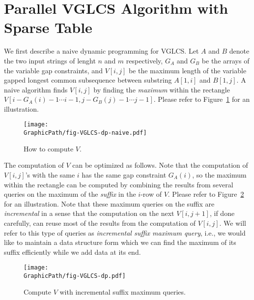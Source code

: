 \section{Parallel VGLCS Algorithm with Sparse Table} %
\label{sec:parallelVGLCS}


We first describe a naive dynamic programming for VGLCS.  Let $A$ and
$B$ denote the two input strings of lenght $n$ and $m$ respectively,
$G_A$ and $G_B$ be the arrays of the variable gap constraints, and
$V[i, j]$ be the maximum length of the variable gapped longest common
subsequence between substring $A[1, i]$ and $B[1, j]$.  A naive
algorithm finds $V[i, j]$ by finding the {\em maximum} within the
rectangle $V[i-G_A(i)-1 \cdots i-1, j-G_B(j)-1 \cdots j-1]$.  Please
refer to Figure~\ref{fig:fig-VGLCS-dp-naive} for an illustration.

\begin{figure}[!thb]
  \texttt{[image: \\GraphicPath/fig-VGLCS-dp-naive.pdf]}
  \caption{How to compute $V$.}
  \label{fig:fig-VGLCS-dp-naive}
\end{figure}

The computation of $V$ can be optimized as follows.  Note that the
computation of $V[i, j]$'s with the same $i$ has the same gap
constraint $G_A(i)$, so the maximum within the rectangle can be
computed by combining the results from several queries on the maximum
of the {\em suffix} in the $i$-row of $V$.  Please refer to
Figure~\ref{fig:fig-VGLCS-dp} for an illustration.  Note that these
maximum queries on the suffix are {\em incremental} in a sense that
the computation on the next $V[i, j + 1]$, if done carefully, can
reuse most of the results from the computation of $V[i, j]$.  We will
refer to this type of queries as {\em incremental suffix maximum
  query}, i.e., we would like to maintain a data structure form which
we can find the maximum of its suffix efficiently while we add data at
its end.

\begin{figure}[!thb]
  \texttt{[image: \\GraphicPath/fig-VGLCS-dp.pdf]}
  \caption{Compute $V$ with incremental suffix maximum queries.}
  \label{fig:fig-VGLCS-dp}
\end{figure}

